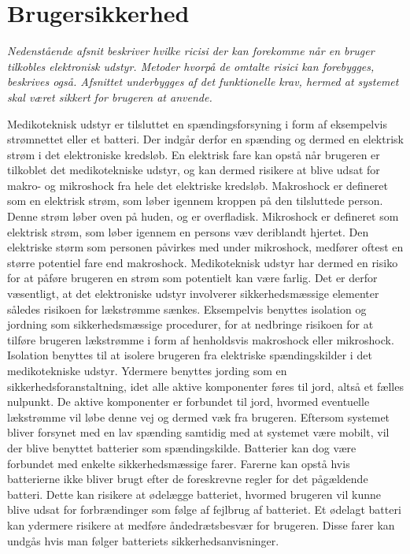 \section{Brugersikkerhed}
\textit{Nedenstående afsnit beskriver hvilke ricisi der kan forekomme når en bruger tilkobles elektronisk udstyr. Metoder hvorpå de omtalte risici kan forebygges, beskrives også. Afsnittet underbygges af det funktionelle krav, hermed at systemet skal været sikkert for brugeren at anvende.}

Medikoteknisk udstyr er tilsluttet en spændingsforsyning i form af eksempelvis strømnettet eller et batteri. Der indgår derfor en spænding og dermed en elektrisk strøm i det elektroniske kredsløb. En elektrisk fare kan opstå når brugeren er tilkoblet det medikotekniske udstyr, og kan dermed risikere at blive udsat for makro- og mikroshock fra hele det elektriske kredsløb. Makroshock er defineret som en elektrisk strøm, som løber igennem kroppen på den tilsluttede person. Denne strøm løber oven på huden, og er overfladisk. Mikroshock er defineret som elektrisk strøm, som løber igennem en persons væv deriblandt hjertet. Den elektriske størm som personen påvirkes med under mikroshock, medfører oftest en større potentiel fare end makroshock. \citep{Webster2011} \newline
Medikoteknisk udstyr har dermed en risiko for at påføre brugeren en strøm som potentielt kan være farlig. Det er derfor væsentligt, at det elektroniske udstyr involverer sikkerhedsmæssige elementer således risikoen for lækstrømme sænkes. Eksempelvis benyttes isolation og jordning som sikkerhedsmæssige procedurer, for at nedbringe risikoen for at tilføre brugeren lækstrømme i form af henholdsvis makroshock eller mikroshock. Isolation benyttes til at isolere brugeren fra elektriske spændingskilder i det medikotekniske udstyr. Ydermere benyttes jording som en sikkerhedsforanstaltning, idet alle aktive komponenter føres til jord, altså et fælles nulpunkt. De aktive komponenter er forbundet til jord, hvormed eventuelle lækstrømme vil løbe denne vej og dermed væk fra brugeren. \citep{Webster2011} \newline 
Eftersom systemet bliver forsynet med en lav spænding samtidig med at systemet være mobilt, vil der blive benyttet batterier som spændingskilde. Batterier kan dog være forbundet med enkelte sikkerhedsmæssige farer. Farerne kan opstå hvis batterierne ikke bliver brugt efter de foreskrevne regler for det pågældende batteri. Dette kan risikere at ødelægge batteriet, hvormed brugeren vil kunne blive udsat for forbrændinger som følge af fejlbrug af batteriet. Et ødelagt batteri kan ydermere risikere at medføre åndedrætsbesvær for brugeren. Disse farer kan undgås hvis man følger batteriets sikkerhedsanvisninger. \citep{NREL2011}


